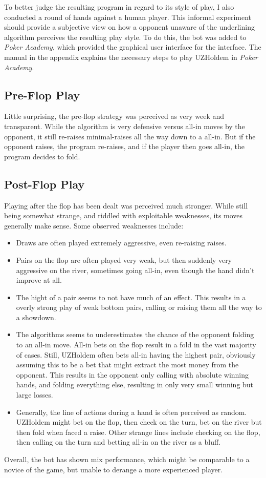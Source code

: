 To better judge the resulting program in regard to its style of play, I also conducted a round of hands against a human player. This informal experiment should provide a subjective view on how a opponent unaware of the underlining algorithm perceives the resulting play style. To do this, the bot was added to \textit{Poker Academy}, which provided the graphical user interface for the interface. The manual in the appendix explains the necessary steps to play UZHoldem in \textit{Poker Academy}.

\subsection{Pre-Flop Play}

Little surprising, the pre-flop strategy was perceived as very week and transparent. While the algorithm is very defensive versus all-in moves by the opponent, it still re-raises minimal-raises all the way down to a all-in. But if the opponent raises, the program re-raises, and if the player then goes all-in, the program decides to fold. 

\subsection{Post-Flop Play}

Playing after the flop has been dealt was perceived much stronger. While still being somewhat strange, and riddled with exploitable weaknesses, its moves generally make sense. Some observed weaknesses include:

\begin{itemize}
\item Draws are often played extremely aggressive, even re-raising raises.
\item Pairs on the flop are often played very weak, but then suddenly very aggressive on the river, sometimes going all-in, even though the hand didn't improve at all.
\item The hight of a pair seems to not have much of an effect. This results in a overly strong play of weak bottom pairs, calling or raising them all the way to a showdown.
\item The algorithms seems to underestimates the chance of the opponent folding to an all-in move. All-in bets on the flop result in a fold in the vast majority of cases. Still, UZHoldem often bets all-in having the highest pair, obviously assuming this to be a bet that might extract the most money from the opponent. This results in the opponent only calling with absolute winning hands, and folding everything else, resulting in only very small winning but large losses.
\item Generally, the line of actions during a hand is often perceived as random. UZHoldem might bet on the flop, then check on the turn, bet on the river but then fold when faced a raise. Other strange lines include checking on the flop, then calling on the turn and betting all-in on the river as a bluff.
\end{itemize}

Overall, the bot has shown mix performance, which might be comparable to a novice of the game, but unable to derange a more experienced player.